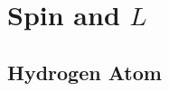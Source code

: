 \documentclass[12pt]{article}
\begin{document}

\newpage
\section{Spin and \(L\)}
\subsection{Hydrogen Atom}
\end{document}
